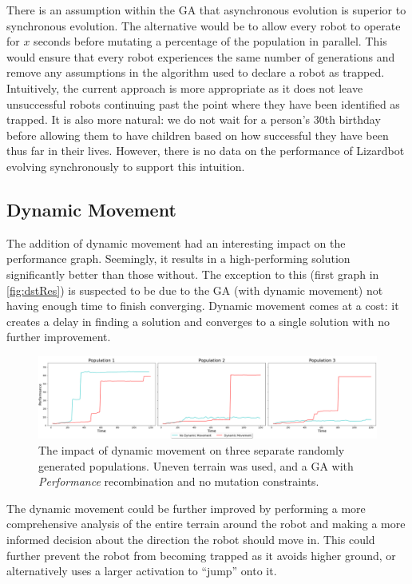\documentclass{article}
\begin{document}
There is an assumption within the GA that asynchronous evolution is superior to synchronous evolution. The alternative would be to allow every robot to operate for $x$ seconds before mutating a percentage of the population in parallel. This would ensure that every robot experiences the same number of generations and remove any assumptions in the algorithm used to declare a robot as trapped. Intuitively, the current approach is more appropriate as it does not leave unsuccessful robots continuing past the point where they have been identified as trapped. It is also more natural: we do not wait for a person’s 30th birthday before allowing them to have children based on how successful they have been thus far in their lives. However, there is no data on the performance of Lizardbot evolving synchronously to support this intuition.\\

\newpage
\subsection{Dynamic Movement}
\label{sec:DST Res}
The addition of dynamic movement had an interesting impact on the performance graph. Seemingly, it results in a high-performing solution significantly better than those without. The exception to this (first graph in \autoref{fig:dstRes}) is suspected to be due to the GA (with dynamic movement) not having enough time to finish converging. Dynamic movement comes at a cost: it creates a delay in finding a solution and converges to a single solution with no further improvement.
\begin{figure}[H]
\centering
\centerline{\includegraphics[scale=0.55]{dstResults} }
\caption{The impact of dynamic movement on three separate randomly generated populations. Uneven terrain was used, and a GA with \textit{Performance} recombination and no mutation constraints.}
\label{fig:dstRes}
\end{figure}
The dynamic movement could be further improved by performing a more comprehensive analysis of the entire terrain around the robot and making a more informed decision about the direction the robot should move in. This could further prevent the robot from becoming trapped as it avoids higher ground, or alternatively uses a larger activation to “jump” onto it.\\
\end{document}
